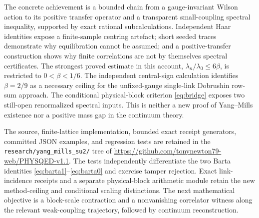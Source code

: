 \documentclass[11pt,a4paper]{article}
\numberwithin{equation}{section}
\begin{document}
The concrete achievement is a bounded chain
from a gauge-invariant Wilson action to its
positive transfer operator and a transparent
small-coupling spectral inequality, supported
by exact rational subcalculations.
Independent Haar identities expose a
finite-sample centring artefact; short seeded
traces demonstrate why equilibration cannot be
assumed; and a positive-transfer construction
shows why finite correlations are not by
themselves spectral certificates.
The strongest proved estimate in this account,
\(\lambda_n/\lambda_0\leq6\beta\), is restricted
to \(0<\beta<1/6\). The independent central-sign
calculation identifies \(\beta=2/9\) as a necessary
ceiling for the unfixed-gauge single-link Dobrushin
row-sum approach. The conditional physical-block
criterion \eqref{eq:bridge} exposes two still-open
renormalized spectral inputs. This is neither a new proof
of Yang--Mills existence nor a positive mass
gap in the continuum theory.

The source, finite-lattice implementation,
bounded exact receipt generators, committed
JSON examples, and regression tests are retained
in the \texttt{research/yang\_mills\_su2/}
tree of \url{https://github.com/tonynewton79-web/PHYSQED-v1.1}.
The tests independently differentiate the
two Barta identities \eqref{eq:barta1}--\eqref{eq:barta0}
and exercise tamper rejection. Exact link-incidence
receipts and a separate physical-block arithmetic
module retain the new method-ceiling and conditional
scaling distinctions. The next mathematical objective
is a block-scale contraction and a nonvanishing
correlator witness along the relevant weak-coupling
trajectory, followed by continuum reconstruction.
\end{document}
